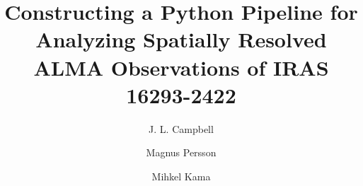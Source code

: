 \documentclass[iop,twocolappendix]{emulateapj}
\begin{document}
\newcommand{\IRAS}{IRAS 16293-2422}
\newcommand{\ALMA}{Atacama Large Millimeter/submillimeter Array}
\newcommand{\A}{CH$_3$CHO}
\newcommand{\M}{CH$_3$OH}
\newcommand{\MF}{CH$_3$OCHO}
\newcommand{\momzero}{$\mu_0$}
\newcommand{\momone}{$\mu_1$}
\newcommand{\momtwo}{$\mu_2$}
\newcommand{\vLSR}{$v_{\mathrm{LSR}}$}
\newcommand{\dispersion}{${\sigma}_v$}
\newcommand{\restfreq}{${\nu}_0$}
\newcommand{\nuLSR}{${\nu}_\mathrm{LSR}$}
\newcommand{\Msun}{M$_{\odot}$}
\newcommand{\Mstar}{$M_{\ast}$}
\newcommand{\Menv}{$M_\mathrm{env}$}
\newcommand{\Td}{$T_d$}
\newcommand{\Flux}{F$_{\nu}$}
\def\plus{\texttt{+}}
\newcommand{\redchisq}{$\bar{{\chi}}^2$}
\newcommand{\Aul}{$A_{ul}$}
\newcommand{\Eul}{$E_{ul}$}
\newcommand{\Nthin}{$N_{ul}^\mathrm{thin}$}
\newcommand{\Ntot}{$N_\mathrm{tot}$}
\newcommand{\Trot}{$T_\mathrm{rot}$}
\newcommand{\kms}{$\mathrm{km\,s^{-1}}$}
\newcommand{\Jybeamkms}{Jy\,beam$^{-1}$\,km\,s$^{-1}$}
\newcommand{\Jybeam}{Jy\,beam$^{-1}$}
\def\jessica#1{\noindent{\bf \textcolor{magenta}{[#1]}}}

\makeatletter
\setlength{\@fptop}{0pt}
\makeatother

\newcommand\T{\rule{0pt}{2.6ex}} %
\newcommand\B{\rule[-1.2ex]{0pt}{0pt}} %

\title{Constructing a Python Pipeline for Analyzing Spatially Resolved ALMA Observations of IRAS 16293-2422}

\author{J. L. Campbell}
\author{Magnus Persson}
\author{Mihkel Kama}

\end{document}
